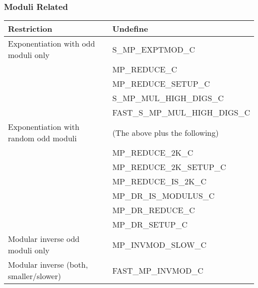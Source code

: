 \documentclass[synpaper]{book}
\begin{document}
\subsubsection{Moduli Related}
\begin{small}
\begin{center}
\begin{tabular}{|l|l|}
\hline \textbf{Restriction} & \textbf{Undefine} \\
\hline Exponentiation with odd moduli only & S\_MP\_EXPTMOD\_C \\
                                           & MP\_REDUCE\_C \\
                                           & MP\_REDUCE\_SETUP\_C \\
                                           & S\_MP\_MUL\_HIGH\_DIGS\_C \\
                                           & FAST\_S\_MP\_MUL\_HIGH\_DIGS\_C \\
\hline Exponentiation with random odd moduli & (The above plus the following) \\
                                           & MP\_REDUCE\_2K\_C \\
                                           & MP\_REDUCE\_2K\_SETUP\_C \\
                                           & MP\_REDUCE\_IS\_2K\_C \\
                                           & MP\_DR\_IS\_MODULUS\_C \\
                                           & MP\_DR\_REDUCE\_C \\
                                           & MP\_DR\_SETUP\_C \\
\hline Modular inverse odd moduli only     & MP\_INVMOD\_SLOW\_C \\
\hline Modular inverse (both, smaller/slower) & FAST\_MP\_INVMOD\_C \\
\hline
\end{tabular}
\end{center}
\end{small}
\end{document}

